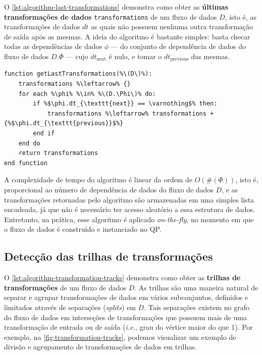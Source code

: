 O \autoref{lst:algorithm-last-transformations} demonstra como obter as \textbf{últimas transformações de dados} \texttt{transformations} de um fluxo de dados \( D \), isto é, as transformações de dados \(dt\) as quais não possuem nenhuma outra transformação de saída após as mesmas. A ideia do algoritmo é bastante simples: basta checar todas as dependências de dados \( \phi \) --- do conjunto de dependência de dados do fluxo de dados \( D.\Phi \) --- cujo \( dt_{\textrm{next}} \) é nulo, e tomar o \( dt_{\textrm{previous}} \) das mesmas.

\begin{minipage}[c]{0.95\textwidth}
\begin{lstlisting}[language=pseudocode,label={lst:algorithm-last-transformations},caption={[Detecção das últimas transformações de dados]Detecção das útimas transformações de dados em uma especificação de fluxo de dados.}]
function getLastTransformations(%\(D\)%):
    transformations %\leftarrow% {}
    for each %\phi% %\in% %\(D.\Phi\)% do:
        if %$\phi.dt_{\texttt{next}} == \varnothing$% then:
            transformations %\leftarrow% transformations + {%$\phi.dt_{\texttt{previous}}$%}
        end if
    end do
    return transformations
end function
\end{lstlisting}
\end{minipage}

A complexidade de tempo do algoritmo é linear da ordem de \( O(\#(\Phi)) \), isto é, proporcional ao número de dependência de dados do fluxo de dados \( D \), e as transformações retornadas pelo algoritmo são armazenadas em uma simples lista encadeada, já que não é necessário ter acesso aleatório a essa estrutura de dados. Entretanto, na prática, esse algoritmo é aplicado \textit{on-the-fly}, no momento em que o fluxo de dados é construído e instanciado no QP.

\subsection{Detecção das trilhas de transformações}

O \autoref{lst:algorithm-transformation-tracks} demonstra como obter as \textbf{trilhas de transformações} de um fluxo de dados \( D \). As trilhas são uma maneira natural de separar e agrupar transformações de dados em vários subconjuntos, definidos e limitados através de separações (\textit{splits}) em \( D \). Tais separações existem no grafo do fluxo de dados em interseções de transformações que possuem mais de uma transformação de entrada ou de saída (\textit{i.e.}, grau do vértice maior do que 1). Por exemplo, na \autoref{fig:transformation-tracks}, podemos visualizar um exemplo de divisão e agrupamento de transformações de dados em trilhas.

